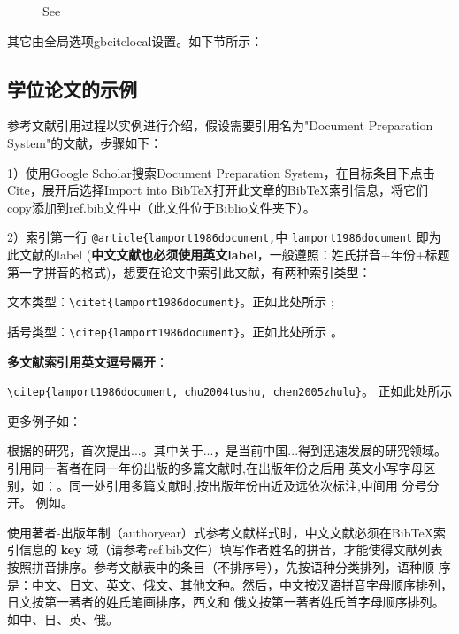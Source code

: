\documentclass[twoside]{article}
\begin{document}
\begin{figure}[!htbp]
  \centering
    {See{\cite{walls2013drought}
    \cite{betts2005aging}}}\label{fig:bi:lang2}
\end{figure}

    其它由全局选项gbcitelocal设置。如下节所示：

\subsection{学位论文的示例}

参考文献引用过程以实例进行介绍，假设需要引用名为"Document Preparation System"的文献，步骤如下：

1）使用Google Scholar搜索Document Preparation System，在目标条目下点击Cite，展开后选择Import into BibTeX打开此文章的BibTeX索引信息，将它们copy添加到ref.bib文件中（此文件位于Biblio文件夹下）。

2）索引第一行 \verb|@article{lamport1986document,|中 \verb|lamport1986document| 即为此文献的label (\textbf{中文文献也必须使用英文label}，一般遵照：姓氏拼音+年份+标题第一字拼音的格式)，想要在论文中索引此文献，有两种索引类型：

文本类型：\verb|\citet{lamport1986document}|。正如此处所示 \textcite{lamport1986document};

括号类型：\verb|\citep{lamport1986document}|。正如此处所示 \cite{lamport1986document}。

\textbf{多文献索引用英文逗号隔开}：

\verb|\citep{lamport1986document, chu2004tushu, chen2005zhulu}|。
正如此处所示 \cite{lamport1986document, chu2004tushu, chen2005zhulu}

更多例子如：

\textcite{walls2013drought}根据\textcite{betts2005aging}的研究，首次提出...。其中关于...\cite{walls2013drought,betts2005aging}，是当前中国...得到迅速发展的研究领域\cite{chen1980zhongguo, bravo1990comparative}。引用同一著者在同一年份出版的多篇文献时,在出版年份之后用
英文小写字母区别，如：\cite{yuan2012lana, yuan2012lanb, yuan2012lanc}。同一处引用多篇文献时,按出版年份由近及远依次标注,中间用
分号分开。
例如\cite{chen1980zhongguo,stamerjohanns2009mathml,hls2012jinji,niu2013zonghe}。

使用著者-出版年制（authoryear）式参考文献样式时，中文文献必须在BibTeX索引信息的 \textbf{key} 域（请参考ref.bib文件）填写作者姓名的拼音，才能使得文献列表按照拼音排序。参考文献表中的条目（不排序号），先按语种分类排列，语种顺 序是：中文、日文、英文、俄文、其他文种。然后，中文按汉语拼音字母顺序排列，日文按第一著者的姓氏笔画排序，西文和 俄文按第一著者姓氏首字母顺序排列。
如中\cite{niu2013zonghe}、日\cite{Bohan1928}、英\cite{stamerjohanns2009mathml}、俄\cite{Dubrovin1906}。
\end{document}

